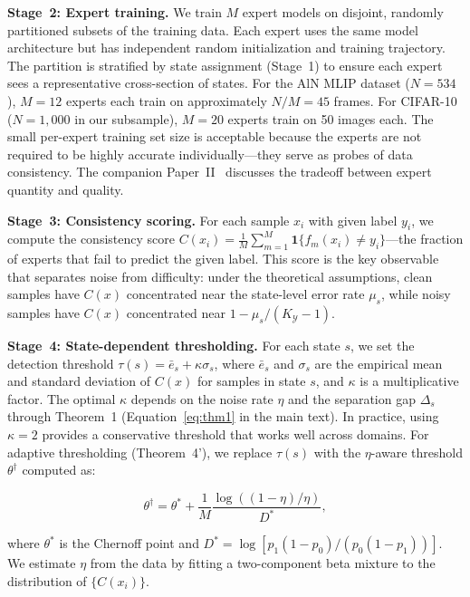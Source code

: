 \textbf{Stage~2: Expert training.} We train $M$ expert models on disjoint, randomly partitioned subsets of the training data. Each expert uses the same model architecture but has independent random initialization and training trajectory. The partition is stratified by state assignment (Stage~1) to ensure each expert sees a representative cross-section of states. For the AlN MLIP dataset ($N = 534$), $M = 12$ experts each train on approximately $N/M = 45$ frames. For CIFAR-10 ($N = 1,000$ in our subsample), $M = 20$ experts train on 50 images each. The small per-expert training set size is acceptable because the experts are not required to be highly accurate individually---they serve as probes of data consistency. The companion Paper~II~\cite{scx2025curation} discusses the tradeoff between expert quantity and quality.

\textbf{Stage~3: Consistency scoring.} For each sample $x_i$ with given label $y_i$, we compute the consistency score $C(x_i) = \frac{1}{M} \sum_{m=1}^M \mathbf{1}\{f_m(x_i) \neq y_i\}$---the fraction of experts that fail to predict the given label. This score is the key observable that separates noise from difficulty: under the theoretical assumptions, clean samples have $C(x)$ concentrated near the state-level error rate $\mu_s$, while noisy samples have $C(x)$ concentrated near $1 - \mu_s/(K_{\mathcal{Y}} - 1)$.

\textbf{Stage~4: State-dependent thresholding.} For each state $s$, we set the detection threshold $\tau(s) = \bar{e}_s + \kappa\sigma_s$, where $\bar{e}_s$ and $\sigma_s$ are the empirical mean and standard deviation of $C(x)$ for samples in state $s$, and $\kappa$ is a multiplicative factor. The optimal $\kappa$ depends on the noise rate $\eta$ and the separation gap $\Delta_s$ through Theorem~1 (Equation~\eqref{eq:thm1} in the main text). In practice, using $\kappa = 2$ provides a conservative threshold that works well across domains. For adaptive thresholding (Theorem~4'), we replace $\tau(s)$ with the $\eta$-aware threshold $\theta^\dagger$ computed as:

\begin{equation}
\theta^\dagger = \theta^* + \frac{1}{M}\frac{\log((1-\eta)/\eta)}{D^*},
\label{eq:adaptive_threshold}
\end{equation}

where $\theta^*$ is the Chernoff point and $D^* = \log[p_1(1-p_0)/(p_0(1-p_1))]$. We estimate $\eta$ from the data by fitting a two-component beta mixture to the distribution of $\{C(x_i)\}$.

